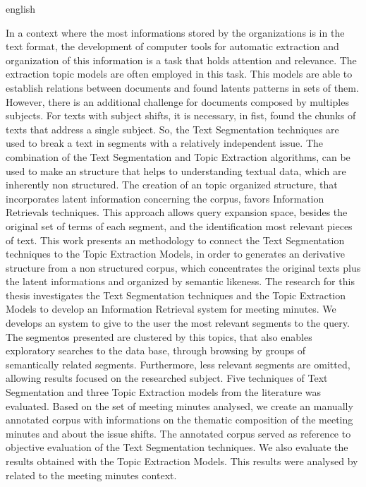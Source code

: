 \begin{resumo}[Abstract]
 \begin{otherlanguage*}{english}




In a context where the most informations stored by the organizations is in the text format, the development of computer tools for automatic extraction and organization of this information is a task that holds attention and relevance.
%
The extraction topic models are often employed in this task. This models are able  to establish relations between documents and found latents patterns in sets of them.  
However, there is an additional challenge for documents composed by multiples subjects. For texts with subject shifts, it is necessary, in fist, found the chunks of texts that address a single subject. So, the Text Segmentation techniques are used to break a text in segments with a relatively independent issue.  
The combination of the Text Segmentation and Topic Extraction algorithms, can be used to make an structure that helps to understanding textual data, which are inherently non structured.  
The creation of an topic organized structure, that incorporates latent information concerning the corpus, favors Information Retrievals techniques. This approach allows query expansion space, besides the original set of terms of each segment, and the identification most relevant pieces of text.  
This work presents an methodology to connect the Text Segmentation techniques to the Topic Extraction Models, in order to generates an derivative structure from a non structured corpus, which concentrates the original texts plus the latent informations and organized by semantic likeness.  
The research for this thesis investigates the Text Segmentation techniques and the Topic Extraction Models to develop an Information Retrieval system for meeting minutes.  
We develops an system to give to the user the most relevant segments to the query. The segmentos presented are clustered by this topics, that also enables exploratory searches to the data base, through browsing by groups of semantically related segments. Furthermore, less relevant segments are omitted, allowing results focused on the researched subject.  
Five techniques of Text Segmentation and three Topic Extraction models from the literature was evaluated. Based on the set of meeting minutes analysed, we create an manually annotated corpus with informations on the thematic composition of the meeting minutes and about the issue shifts. The annotated corpus served as reference to objective evaluation of the Text Segmentation techniques. We also evaluate the results obtained with the Topic Extraction Models. This results were analysed by related to the meeting minutes context.  

\end{otherlanguage*}
\end{resumo}
